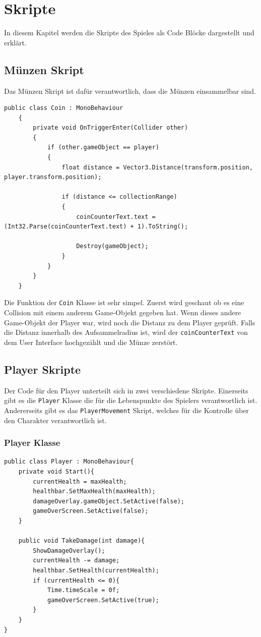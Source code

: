 \pagebreak
\chapter{Skripte}
In diesem Kapitel werden die Skripte des Spieles als Code Blöcke dargestellt und erklärt. 

\section{Münzen Skript}
Das Münzen Skript ist dafür verantwortlich, dass die Münzen einsammelbar sind. 
\begin{lstlisting}[language=CSharp,caption={Coin Klasse.},label=code:coin]
    public class Coin : MonoBehaviour
    {
        private void OnTriggerEnter(Collider other)
        {
            if (other.gameObject == player)
            {
                float distance = Vector3.Distance(transform.position, player.transform.position);
                
                if (distance <= collectionRange)
                {
                    coinCounterText.text = (Int32.Parse(coinCounterText.text) + 1).ToString();
                    
                    Destroy(gameObject);
                }
            }
        }
    }
\end{lstlisting}   

Die Funktion der \verb+Coin+ Klasse ist sehr simpel. Zuerst wird geschaut ob es eine Collision mit einem anderem Game-Objekt gegeben hat. Wenn dieses andere Game-Objekt der Player war, wird noch die Distanz zu dem Player geprüft. Falls die Distanz innerhalb des Aufsammelradius ist, wird der \verb+coinCounterText+ von dem User Interface hochgezählt und die Münze zerstört.


\pagebreak
\section{Player Skripte}
Der Code für den Player unterteilt sich in zwei verschiedene Skripte. Einerseits gibt es die \verb+Player+ Klasse die für die Lebenspunkte des Spielers verantwortlich ist. Andererseits gibt es das \verb+PlayerMovement+ Skript, welches für die Kontrolle über den Charakter verantwortlich ist. \\

\subsection{Player Klasse}
\begin{lstlisting}[language=CSharp,caption={Player Klasse.},label=code:player]
public class Player : MonoBehaviour{
    private void Start(){
        currentHealth = maxHealth;
        healthbar.SetMaxHealth(maxHealth);
        damageOverlay.gameObject.SetActive(false);
        gameOverScreen.SetActive(false);
    }

    public void TakeDamage(int damage){
        ShowDamageOverlay();
        currentHealth -= damage;
        healthbar.SetHealth(currentHealth);
        if (currentHealth <= 0){
            Time.timeScale = 0f;
            gameOverScreen.SetActive(true);
        }
    }
}
\end{lstlisting}

